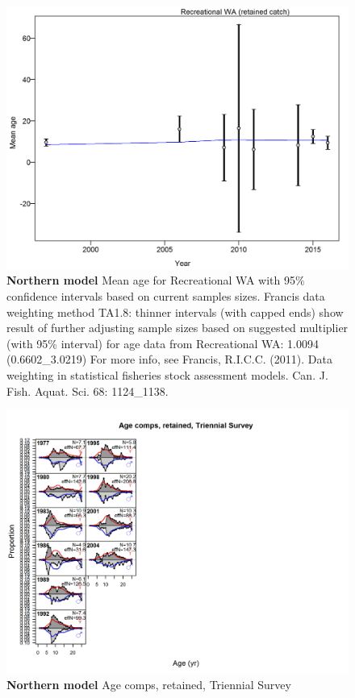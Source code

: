 \documentclass[12pt,]{article}
\begin{document}
\begin{figure}[htbp]
\centering
\includegraphics{./r4ss/plots_mod1/comp_agefit_data_weighting_TA1.8_Recreational WA.png}
\caption{\textbf{Northern model} Mean age for Recreational WA with 95\%
confidence intervals based on current samples sizes. Francis data
weighting method TA1.8: thinner intervals (with capped ends) show result
of further adjusting sample sizes based on suggested multiplier (with
95\% interval) for age data from Recreational WA: 1.0094
(0.6602\_3.0219) For more info, see Francis, R.I.C.C. (2011). Data
weighting in statistical fisheries stock assessment models. Can. J.
Fish. Aquat. Sci. 68: 1124\_1138.
\label{fig:mod1_9_comp_agefit_data_weighting_TA1.8_Recreational WA}}
\end{figure}

\begin{figure}[htbp]
\centering
\includegraphics{./r4ss/plots_mod1/comp_agefit_flt5mkt2.png}
\caption{\textbf{Northern model} Age comps, retained, Triennial Survey
\label{fig:mod1_10_comp_agefit_flt5mkt2}}
\end{figure}
\end{document}
